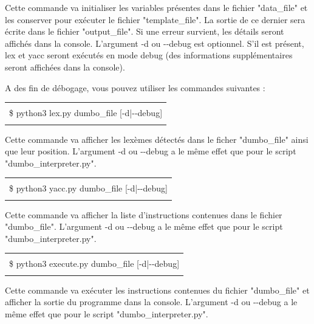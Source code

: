\documentclass[10pt,a4paper]{article}
\begin{document}
	Cette commande va initialiser les variables présentes dans le fichier "data\_file" et les conserver pour exécuter le fichier "template\_file". La sortie de ce dernier sera écrite dans le fichier "output\_file". Si une erreur survient, les détails seront affichés dans la console. L'argument -d ou -{}-debug est optionnel. S'il est présent, lex et yacc seront exécutés en mode debug (des informations supplémentaires seront affichées dans la console).
	
	A des fin de débogage, vous pouvez utiliser les commandes suivantes :
	
	\begin{center}
	\begin{tabular}{|l|}
		\hline \\
		\$ python3 lex.py dumbo\_file [-d|-{}-debug]\\
		\\
		\hline
	\end{tabular}
	\end{center}
	
	Cette commande va afficher les lexèmes détectés dans le ficher "dumbo\_file" ainsi que leur position. L'argument -d ou -{}-debug a le même effet que pour le script "dumbo\_interpreter.py".
	
	\begin{center}
	\begin{tabular}{|l|}
		\hline \\
		\$ python3 yacc.py dumbo\_file [-d|-{}-debug]\\
		\\
		\hline
	\end{tabular}
	\end{center}
	
	Cette commande va afficher la liste d'instructions contenues dans le fichier "dumbo\_file". L'argument -d ou -{}-debug a le même effet que pour le script "dumbo\_interpreter.py".
	
	\begin{center}
	\begin{tabular}{|l|}
		\hline \\
		\$ python3 execute.py dumbo\_file [-d|-{}-debug]\\
		\\
		\hline
	\end{tabular}
	\end{center}
	
	Cette commande va exécuter les instructions contenues du fichier "dumbo\_file" et afficher la sortie du programme dans la console. L'argument -d ou -{}-debug a le même effet que pour le script "dumbo\_interpreter.py".
	
\end{document}
